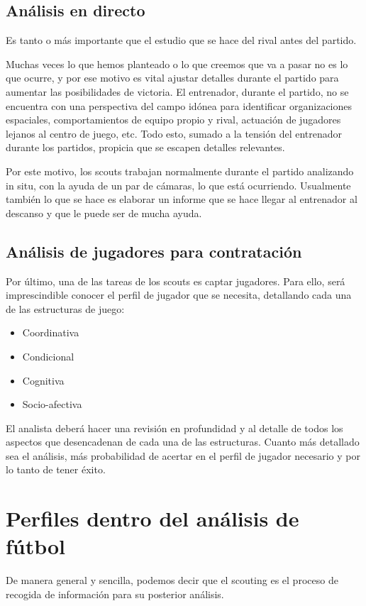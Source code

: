 \subsection{Análisis en directo}
Es tanto o más importante que el estudio que se hace del rival antes 
del partido.

Muchas veces lo que hemos planteado o lo que creemos que va a pasar no 
es lo que ocurre, y por ese motivo es vital ajustar detalles durante 
el partido para aumentar las posibilidades de victoria. El entrenador, 
durante el partido, no se encuentra con una perspectiva del campo 
idónea para identificar organizaciones espaciales, comportamientos 
de equipo propio y rival, actuación de jugadores lejanos al centro 
de juego, etc. Todo esto, sumado a la tensión del entrenador durante 
los partidos, propicia que se escapen detalles relevantes.

Por este motivo, los scouts trabajan normalmente durante el partido analizando 
in situ, con la ayuda de un par de cámaras, lo que está 
ocurriendo. Usualmente también lo que se hace es elaborar un informe 
que se hace llegar al entrenador al descanso y que le puede ser 
de mucha ayuda.


\subsection{Análisis de jugadores para contratación}

Por último, una de las tareas de los scouts es captar jugadores. 
Para ello, será imprescindible conocer el perfil de jugador que 
se necesita, detallando cada una de las estructuras de juego:

\begin{itemize}
    \item Coordinativa
    \item Condicional
    \item Cognitiva
    \item Socio-afectiva
\end{itemize}

El analista deberá hacer una revisión en profundidad y al detalle de 
todos los aspectos que desencadenan de cada una de las estructuras. 
Cuanto más detallado sea el análisis, más probabilidad de acertar 
en el perfil de jugador necesario y por lo tanto de tener éxito.

\section{Perfiles dentro del análisis de fútbol}
De manera general y sencilla, podemos decir que el scouting es el proceso de 
recogida de información para su posterior análisis.

